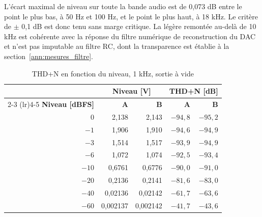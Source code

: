
L'écart maximal de niveau sur toute la bande audio est de 0,073 dB entre le point le plus bas, à 50 Hz et 100 Hz, et le point le plus haut, à 18 kHz. Le critère de $\pm$ 0,1 dB est donc tenu sans marge critique. La légère remontée au-delà de 10 kHz est cohérente avec la réponse du filtre numérique de reconstruction du \gls{DAC} et n'est pas imputable au filtre RC, dont la transparence est établie à la section~\ref{ann:mesures_filtre}.

\begin{table}[H]
  \centering
  \caption{THD+N en fonction du niveau, 1 kHz, sortie à vide}
  \label{tab:ann_ap_niveau}
  \small
  \setlength{\tabcolsep}{6pt}
  \begin{tabular}{@{}r rr rr@{}}
    \toprule
                           & \multicolumn{2}{c}{\textbf{Niveau [V]}} & \multicolumn{2}{c}{\textbf{THD+N [dB]}}                           \\
    \cmidrule(lr){2-3} \cmidrule(lr){4-5}
    \textbf{Niveau [dBFS]} & \textbf{A}                              & \textbf{B}                              & \textbf{A} & \textbf{B} \\
    \midrule
    0                      & 2,138                                   & 2,143                                   & $-94,8$    & $-95,2$    \\
    $-1$                   & 1,906                                   & 1,910                                   & $-94,6$    & $-94,9$    \\
    $-3$                   & 1,514                                   & 1,517                                   & $-93,9$    & $-94,9$    \\
    $-6$                   & 1,072                                   & 1,074                                   & $-92,5$    & $-93,4$    \\
    $-10$                  & 0,6761                                  & 0,6776                                  & $-90,0$    & $-91,0$    \\
    $-20$                  & 0,2136                                  & 0,2141                                  & $-81,6$    & $-83,0$    \\
    $-40$                  & 0,02136                                 & 0,02142                                 & $-61,7$    & $-63,6$    \\
    $-60$                  & 0,002137                                & 0,002142                                & $-41,7$    & $-43,6$    \\
    \bottomrule
  \end{tabular}
\end{table}


